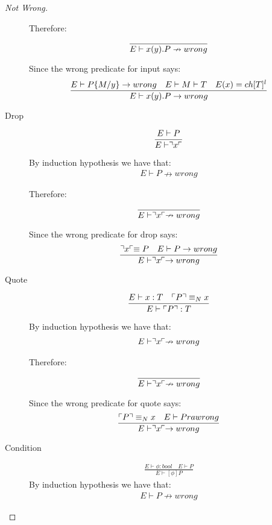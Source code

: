 \begin{proof}[Not Wrong]
\begin{description}
		Therefore:
		\begin{align*}
		\frac{}{E \vdash x(y).P \nrightarrow wrong}
		\end{align*}
		
		Since the wrong predicate for input says:
		\begin{align*}
		\frac{E \vdash P\{M/y\}\rightarrow wrong \quad E\vdash M\vdash T \quad E(x)=ch[T]^l}{E \vdash x(y).P \rightarrow wrong}
		\end{align*}
	\item[Drop]
		\begin{align*}
		\frac{E \vdash P}{E \vdash \urcorner x \ulcorner}
		\end{align*}
		
		By induction hypothesis we have that:
		\begin{align*}
		E \vdash P \nrightarrow wrong
		\end{align*}
		
		Therefore:
		\begin{align*}
		\frac{}{E \vdash \urcorner x \ulcorner \nrightarrow wrong}
		\end{align*}
		
		Since the wrong predicate for drop says:
		\begin{align*}
		\frac{\urcorner x \ulcorner \equiv P \quad E \vdash P \rightarrow wrong}{E \vdash \urcorner x \ulcorner \rightarrow wrong}
		\end{align*}
	\item[Quote]
		\begin{align*}
		\frac{E \vdash x:T \quad \ulcorner P \urcorner \equiv _N x}{E \vdash \ulcorner P \urcorner:T}
		\end{align*}
		
		By induction hypothesis we have that:
		\begin{align*}
		E \vdash \urcorner x \ulcorner \nrightarrow wrong
		\end{align*}
		
		Therefore:
		\begin{align*}
		\frac{}{E \vdash \urcorner x \ulcorner \nrightarrow wrong}
		\end{align*}
		
		Since the wrong predicate for quote says:
		\begin{align*}
		\frac{\ulcorner P \urcorner \equiv _N x \quad E \vdash P ra wrong}{E \vdash \urcorner x \ulcorner \rightarrow wrong}
		\end{align*}
	\item[Condition]
		\begin{align*}
		\frac{E \vdash \phi : bool \quad E \vdash P}{E \vdash [\phi]P}
		\end{align*}
		By induction hypothesis we have that:
		\begin{align*}
		E \vdash P \nrightarrow wrong
		\end{align*}
		

\end{description}
\end{proof}
